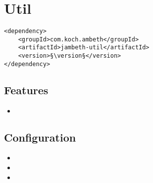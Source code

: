 \section{Util}
\label{module:Util}
\ClearAPI
\TODO
\begin{lstlisting}[style=POM,caption={Maven modules to use \emph{Ambeth Util}}]
<dependency>
	<groupId>com.koch.ambeth</groupId>
	<artifactId>jambeth-util</artifactId>
	<version>§\version§</version>
</dependency>
\end{lstlisting}
\subsection{Features}
\begin{itemize}
	\item \TODO
\end{itemize}

\subsection{Configuration}
\begin{itemize}
	\item {}
	\item {}
	\item {}
\end{itemize}
